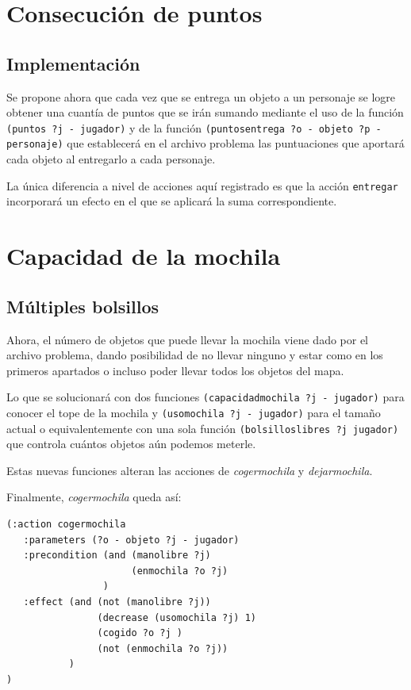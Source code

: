 \documentclass[a4paper, 11pt]{article}
\begin{document}
\section{Consecución de puntos}
	\subsection{Implementación}
		Se propone ahora que cada vez que se entrega un objeto a un personaje se logre obtener una
		cuantía de puntos que se irán sumando mediante el uso de la función \verb|(puntos ?j - jugador)|
		y de la función \verb|(puntosentrega ?o - objeto ?p - personaje)| que establecerá en el archivo
		problema las puntuaciones que aportará cada objeto al entregarlo a cada personaje.
		
		La única diferencia a nivel de acciones aquí registrado es que la acción \verb|entregar|
		incorporará un efecto en el que se aplicará la suma correspondiente.
		
\section{Capacidad de la mochila}
	\subsection{Múltiples bolsillos}
		Ahora, el número de objetos que puede llevar la mochila viene dado por el archivo problema, dando
		posibilidad de no llevar ninguno y estar como en los primeros apartados o incluso poder llevar todos
		los objetos del mapa.
		
		Lo que se solucionará con dos funciones \verb|(capacidadmochila ?j - jugador)| para conocer el tope
		de la mochila y \verb|(usomochila ?j - jugador)| para el tamaño actual o equivalentemente con una
		sola función \verb|(bolsilloslibres ?j jugador)| que controla cuántos objetos aún podemos meterle.
		
		Estas nuevas funciones alteran las acciones de \textit{cogermochila} y \textit{dejarmochila}.
		
		Finalmente, \textit{cogermochila} queda así:
		\begin{verbatim}
(:action cogermochila
   :parameters (?o - objeto ?j - jugador)
   :precondition (and (manolibre ?j)
                      (enmochila ?o ?j)
                 )
   :effect (and (not (manolibre ?j))
                (decrease (usomochila ?j) 1)
                (cogido ?o ?j )
                (not (enmochila ?o ?j))
           )
)
		\end{verbatim}
\end{document}
